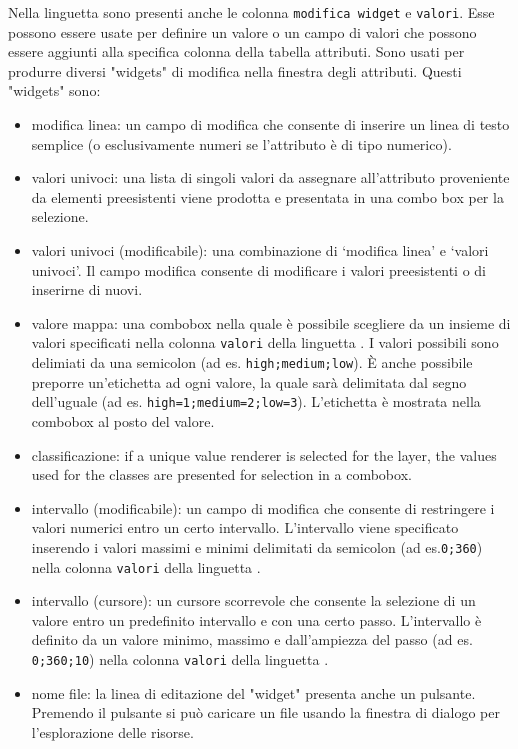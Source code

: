 
Nella linguetta  sono presenti anche le colonna
\texttt{modifica widget} e \texttt{valori}. Esse possono essere usate per
definire un valore o un campo di valori che possono essere aggiunti alla
specifica colonna della tabella attributi. 
Sono usati per produrre diversi "widgets" di modifica nella finestra degli
attributi. Questi "widgets" sono:

\begin{itemize}
\item modifica linea: un campo di modifica che consente di inserire un linea
di testo semplice (o esclusivamente numeri se l'attributo è di tipo numerico).
\item valori univoci: una lista di singoli valori da assegnare all'attributo
proveniente da elementi preesistenti viene prodotta e presentata in una combo
box per la selezione.
\item valori univoci (modificabile): una combinazione di `modifica linea' e
`valori univoci'. Il campo modifica consente di modificare i valori
preesistenti o di inserirne di nuovi.
\item valore mappa: una combobox nella quale è possibile scegliere da un
insieme di valori specificati nella colonna \texttt{valori} della linguetta
. I valori possibili sono delimiati da una semicolon (ad es.
\verb|high;medium;low|). È anche possibile preporre un'etichetta ad ogni
valore, la quale sarà delimitata dal segno dell'uguale (ad es.
\verb|high=1;medium=2;low=3|). L'etichetta è mostrata nella combobox al posto
del valore.
\item classificazione: if a unique value renderer is selected for the layer, the
values used for the classes are presented for selection in a combobox.
\item intervallo (modificabile): un campo di modifica che consente di
restringere i valori numerici entro un certo intervallo. L'intervallo viene
specificato inserendo i valori massimi e minimi delimitati da semicolon (ad
es.\verb|0;360|) nella colonna \texttt{valori} della linguetta .
\item intervallo (cursore): un cursore scorrevole che consente la selezione di
un valore entro un predefinito intervallo e con una certo passo.
L'intervallo è definito da un valore minimo, massimo e dall'ampiezza del passo
(ad es. \verb|0;360;10|) nella colonna \texttt{valori} della linguetta  .
\item nome file: la linea di editazione del "widget" presenta anche un
pulsante. Premendo il pulsante si può caricare un file usando la finestra di
dialogo per l'esplorazione delle risorse.
\end{itemize}

